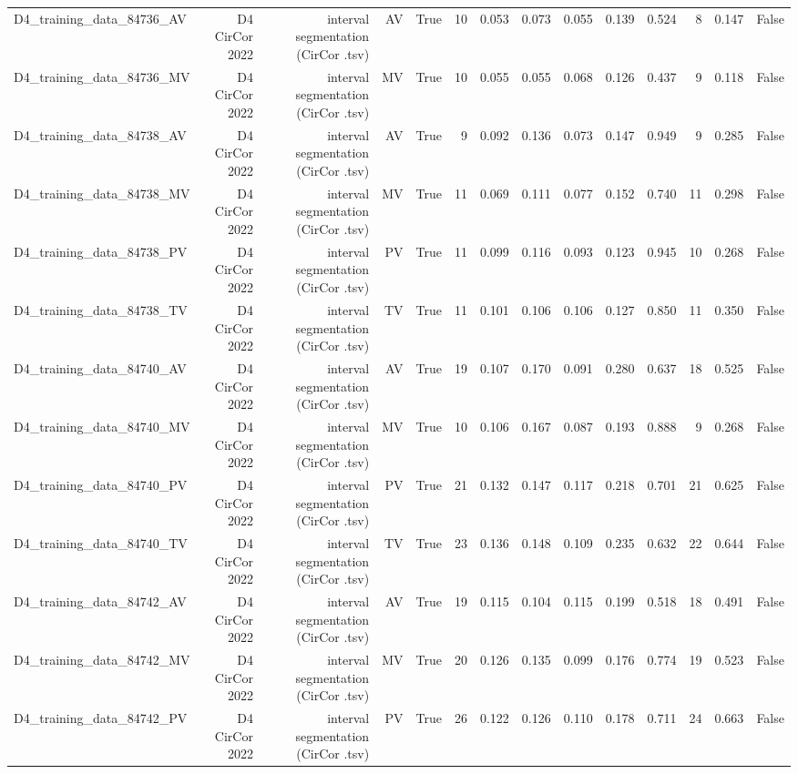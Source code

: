 \begin{table}[htbp]
\begin{tabular}{lrrrrrrrrrrrrr}
    D4\_training\_data\_84736\_AV & D4 CirCor 2022 & interval segmentation (CirCor .tsv) & AV & True & 10 & 0.053 & 0.073 & 0.055 & 0.139 & 0.524 & 8 & 0.147 & False \\
    D4\_training\_data\_84736\_MV & D4 CirCor 2022 & interval segmentation (CirCor .tsv) & MV & True & 10 & 0.055 & 0.055 & 0.068 & 0.126 & 0.437 & 9 & 0.118 & False \\
    D4\_training\_data\_84738\_AV & D4 CirCor 2022 & interval segmentation (CirCor .tsv) & AV & True & 9 & 0.092 & 0.136 & 0.073 & 0.147 & 0.949 & 9 & 0.285 & False \\
    D4\_training\_data\_84738\_MV & D4 CirCor 2022 & interval segmentation (CirCor .tsv) & MV & True & 11 & 0.069 & 0.111 & 0.077 & 0.152 & 0.740 & 11 & 0.298 & False \\
    D4\_training\_data\_84738\_PV & D4 CirCor 2022 & interval segmentation (CirCor .tsv) & PV & True & 11 & 0.099 & 0.116 & 0.093 & 0.123 & 0.945 & 10 & 0.268 & False \\
    D4\_training\_data\_84738\_TV & D4 CirCor 2022 & interval segmentation (CirCor .tsv) & TV & True & 11 & 0.101 & 0.106 & 0.106 & 0.127 & 0.850 & 11 & 0.350 & False \\
    D4\_training\_data\_84740\_AV & D4 CirCor 2022 & interval segmentation (CirCor .tsv) & AV & True & 19 & 0.107 & 0.170 & 0.091 & 0.280 & 0.637 & 18 & 0.525 & False \\
    D4\_training\_data\_84740\_MV & D4 CirCor 2022 & interval segmentation (CirCor .tsv) & MV & True & 10 & 0.106 & 0.167 & 0.087 & 0.193 & 0.888 & 9 & 0.268 & False \\
    D4\_training\_data\_84740\_PV & D4 CirCor 2022 & interval segmentation (CirCor .tsv) & PV & True & 21 & 0.132 & 0.147 & 0.117 & 0.218 & 0.701 & 21 & 0.625 & False \\
    D4\_training\_data\_84740\_TV & D4 CirCor 2022 & interval segmentation (CirCor .tsv) & TV & True & 23 & 0.136 & 0.148 & 0.109 & 0.235 & 0.632 & 22 & 0.644 & False \\
    D4\_training\_data\_84742\_AV & D4 CirCor 2022 & interval segmentation (CirCor .tsv) & AV & True & 19 & 0.115 & 0.104 & 0.115 & 0.199 & 0.518 & 18 & 0.491 & False \\
    D4\_training\_data\_84742\_MV & D4 CirCor 2022 & interval segmentation (CirCor .tsv) & MV & True & 20 & 0.126 & 0.135 & 0.099 & 0.176 & 0.774 & 19 & 0.523 & False \\
    D4\_training\_data\_84742\_PV & D4 CirCor 2022 & interval segmentation (CirCor .tsv) & PV & True & 26 & 0.122 & 0.126 & 0.110 & 0.178 & 0.711 & 24 & 0.663 & False \\

\end{tabular}
\end{table}
